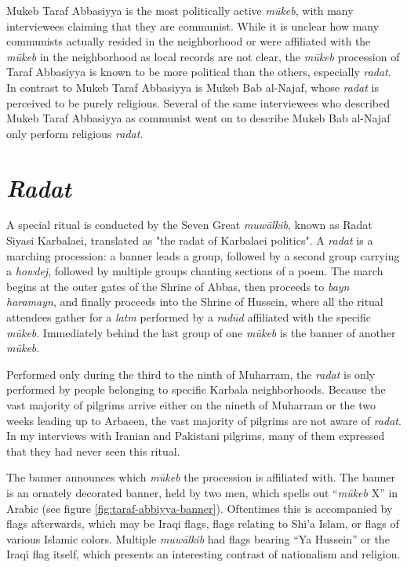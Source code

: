 Mukeb Taraf Abbasiyya is the most politically active \emph{mūkeb}, with many interviewees claiming that they are communist. While it is unclear how many communists actually resided in the neighborhood or were affiliated with the \emph{mūkeb} in the neighborhood as local records are not clear, the \emph{mūkeb} procession of Taraf Abbasiyya is known to be more political than the others, especially \emph{radat}. In contrast to Mukeb Taraf Abbasiyya is Mukeb Bab al-Najaf, whose \emph{radat} is perceived to be purely religious. Several of the same interviewees who described Mukeb Taraf Abbasiyya as communist went on to describe Mukeb Bab al-Najaf only perform religious \emph{radat}. 

\section{\emph{Radat}}
A special ritual is conducted by the Seven Great \emph{muwālkib}, known as Radat Siyasi Karbalaei, translated as "the radat of Karbalaei politics". A \emph{radat} is a marching procession: a banner leads a group, followed by a second group carrying a \emph{howdej}, followed by multiple groups chanting sections of a poem. The march begins at the outer gates of the Shrine of Abbas, then proceeds to \emph{bayn haramayn}, and finally proceeds into the Shrine of Hussein, where all the ritual attendees gather for a \emph{latm} performed by a \emph{radūd} affiliated with the specific \emph{mūkeb}. Immediately behind the last group of one \emph{mūkeb} is the banner of another \emph{mūkeb}. 

Performed only during the third to the ninth of Muharram, the \emph{radat} is only performed by people belonging to specific Karbala neighborhoods. Because the vast majority of pilgrims arrive either on the nineth of Muharram or the two weeks leading up to Arbaeen, the vast majority of pilgrims are not aware of \emph{radat}. In my interviews with Iranian and Pakistani pilgrims, many of them expressed that they had never seen this ritual. 

The banner announces which \emph{mūkeb} the procession is affiliated with. The banner is an ornately decorated banner, held by two men, which spells out “\emph{mūkeb} X” in Arabic (see figure \ref{fig:taraf-abbiyya-banner}). Oftentimes this is accompanied by flags afterwards, which may be Iraqi flags, flags relating to Shi'a Islam, or flags of various Islamic colors. Multiple \emph{muwālkib} had flags bearing “Ya Hussein” or the Iraqi flag itself, which presents an interesting contrast of nationalism and religion. 

